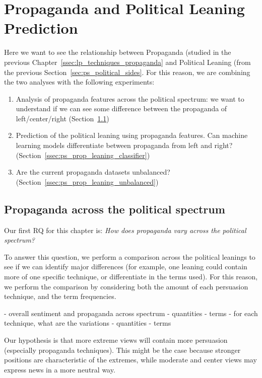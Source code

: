 \section{\statusorange Propaganda and Political Leaning Prediction}
\label{sec:ps_prop_and_leaning}

Here we want to see the relationship between Propaganda (studied in the previous Chapter~\ref{ssec:lp_techniques_propaganda} and Political Leaning (from the previous Section~\ref{sec:ps_political_sides}.
For this reason, we are combining the two analyses with the following experiments:

\begin{enumerate}
    \item Analysis of propaganda features across the political spectrum: we want to understand if we can see some difference between the propaganda of left/center/right (Section~\ref{ssec:ps_prop_leaning_across})
    \item Prediction of the political leaning using propaganda features. Can machine learning models differentiate between propaganda from left and right? (Section~\ref{ssec:ps_prop_leaning_classifier})
    \item Are the current propaganda datasets unbalanced? (Section~\ref{ssec:ps_prop_leaning_unbalanced})
\end{enumerate}

\subsection{\statusorange Propaganda across the political spectrum}
\label{ssec:ps_prop_leaning_across}

Our first RQ for this chapter is: \emph{How does propaganda vary across the political spectrum?}

To answer this question, we perform a comparison across the political leanings to see if we can identify major differences (for example, one leaning could contain more of one specific technique, or differentiate in the terms used).
For this reason, we perform the comparison by considering both the amount of each persuasion technique, and the term frequencies.

- overall sentiment and propaganda across spectrum
    - quantities
    - terms
- for each technique, what are the variations
    - quantities
    - terms


Our hypothesis is that more extreme views will contain more persuasion (especially propaganda techniques). This might be the case because stronger positions are characteristic of the extremes, while moderate and center views may express news in a more neutral way.

